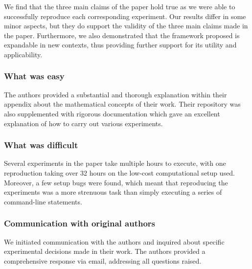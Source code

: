 We find that the three main claims of the paper hold true as we were able to successfully reproduce each corresponding experiment. Our results differ in some minor aspects, but they do support the validity of the three main claims made in the paper. Furthermore, we also demonstrated that the framework proposed is expandable in new contexts, thus providing further support for its utility and applicability. 

\subsubsection*{What was easy}

The authors provided a substantial and thorough explanation within their appendix about the mathematical concepts of their work. Their repository was also supplemented with rigorous documentation which gave an excellent explanation of how to carry out various experiments.  

\subsubsection*{What was difficult}


Several experiments in the paper take multiple hours to execute, with one reproduction taking over 32 hours on the low-cost computational setup used. Moreover, a few setup bugs were found, which meant that reproducing the experiments was a more strenuous task than simply executing a series of command-line statements. 

\subsubsection*{Communication with original authors}
We initiated communication with the authors and inquired about specific experimental decisions made in their work. The authors provided a comprehensive response via email, addressing all questions raised.

